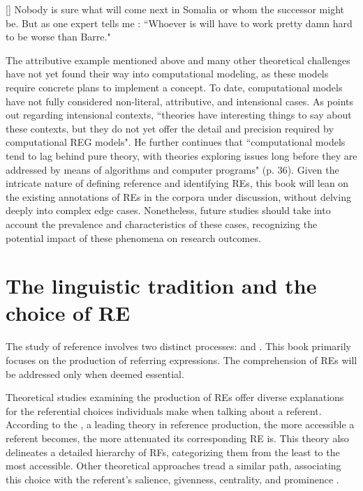 \begin{exe}
	\ex\label{ex:somalia} [] Nobody is sure what will come next in Somalia or whom the successor might be. But as one expert tells me : ``Whoever  is will
	have to work pretty damn hard to be worse than Barre."
\end{exe}

The attributive example mentioned above and many other theoretical challenges have not yet found their way into computational modeling, as these models require concrete plans to implement a concept. To date, computational models have not fully considered non-literal, attributive, and intensional cases. As \citet{van2016computational} points out regarding intensional contexts, ``theories have interesting things to say about these contexts, but they do not yet offer the detail and precision required by computational REG models". He further continues that ``computational models tend to lag behind pure theory, with theories exploring issues long before they are addressed by means of algorithms and computer programs" (p. 36). Given the intricate nature of defining reference and identifying REs, this book will lean on the existing annotations of REs in the corpora under discussion, without delving deeply into complex edge cases. Nonetheless, future studies should take into account the prevalence and characteristics of these cases, recognizing the potential impact of these phenomena on research outcomes.

\section{The linguistic tradition and the choice of RE}\label{sec:lingtradition}
The study of reference involves two distinct processes:  and  \citep{hendriks2016cognitive}. This book primarily focuses on the production of referring expressions. The comprehension of REs will be addressed only when deemed essential.

Theoretical studies examining the production of REs offer diverse explanations for the referential choices individuals make when talking about a referent. According to the  \citep{ariel2001accessibility}, a leading theory in reference production, the more accessible a referent becomes, the more attenuated its corresponding RE is. This theory also delineates a detailed hierarchy of RFs, categorizing them from the least to the most accessible. Other theoretical approaches tread a similar path, associating this choice with the referent's salience, givenness, centrality, and prominence \citep{gundel1993cognitive,grosz1995centering,chiarcos2011mental,Heusinger2019}.

